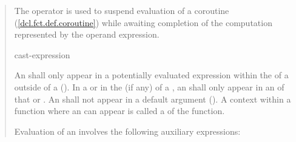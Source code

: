 \begin{quote}
\pnum
The  operator is used to suspend evaluation of a 
coroutine (\ref{dcl.fct.def.coroutine}) while awaiting completion of the computation represented by the operand expression.

\begin{bnf}
  \br
   cast-expression
\end{bnf}

\pnum
An  shall only appear in a potentially evaluated expression within the  of a  
 outside of a  (). In a  or in the  (if any) of a , an  shall only appear in an  of that  or .
An  shall not appear in a default argument (). A context within a function where an  can appear is called a  of the function.

\pnum
Evaluation of an  involves the following auxiliary expressions:

\begin{itemize}
	
  

\end{itemize}
\end{quote}
